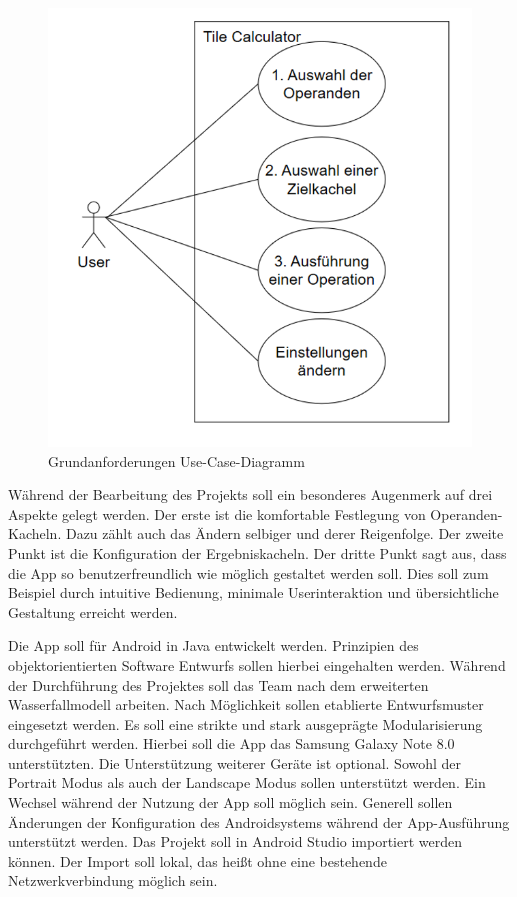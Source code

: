 \begin{figure}[h]
	\includegraphics[width=0.75\columnwidth]{img/funktionsumfang-grundanforderungen-use-case-diagramm}
	\caption[Grundanforderungen Use-Case-Diagramm]{Grundanforderungen Use-Case-Diagramm\footnotemark}
\end{figure}


Während der Bearbeitung des Projekts soll ein besonderes Augenmerk auf drei Aspekte gelegt werden. Der erste ist die komfortable Festlegung von Operanden-Kacheln. Dazu zählt auch das Ändern selbiger und derer Reigenfolge. Der zweite Punkt ist die Konfiguration der Ergebniskacheln. Der dritte Punkt sagt aus, dass die App so benutzerfreundlich wie möglich gestaltet werden soll. Dies soll zum Beispiel durch intuitive Bedienung, minimale Userinteraktion und übersichtliche Gestaltung erreicht werden. 

Die App soll für Android in Java entwickelt werden. Prinzipien des objektorientierten Software Entwurfs sollen hierbei eingehalten werden. Während der Durchführung des Projektes soll das Team nach dem erweiterten Wasserfallmodell arbeiten. Nach Möglichkeit sollen etablierte Entwurfsmuster eingesetzt werden. Es soll eine strikte und stark ausgeprägte Modularisierung durchgeführt werden. Hierbei soll die App das Samsung Galaxy Note 8.0 unterstützten. Die Unterstützung weiterer Geräte ist optional. Sowohl der Portrait Modus als auch der Landscape Modus sollen unterstützt werden. Ein Wechsel während der Nutzung der App soll möglich sein. Generell sollen Änderungen der Konfiguration des Androidsystems während der App-Ausführung unterstützt werden. Das Projekt soll in Android Studio importiert werden können. Der Import soll lokal, das heißt ohne eine bestehende Netzwerkverbindung möglich sein.


